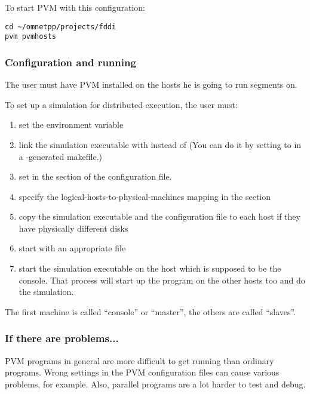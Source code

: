 To start PVM with this configuration:

\begin{verbatim}
cd ~/omnetpp/projects/fddi
pvm pvmhosts
\end{verbatim}

\subsubsection{Configuration and running}

The user must have PVM installed on the hosts he is going to
run segments on.


To set up a simulation for distributed execution, the user must:
\begin{enumerate}
\item{set the  environment variable}
\item{link the simulation executable with  instead of
   (You can do it by setting  to
   in a -generated makefile.)}
\item{set  in the \ttt{[General]} section of the
  configuration file.}
\item{specify the logical-hosts-to-physical-machines mapping in the
  \ttt{[Machines]} section}
\item{copy the simulation executable and the configuration file to
  each host if they have physically different disks}
\item{start  with an appropriate  file}
\item{start the simulation executable on the host which is supposed to
  be the console. That process will start up the program on the other
  hosts too and do the simulation.}
\end{enumerate}

The first machine is called ``console'' or ``master'', the
others are called ``slaves''.


\subsubsection{If there are problems...}


PVM programs in general are more difficult to get running than
ordinary programs. Wrong settings in the PVM configuration files
can cause various problems, for example. Also, parallel programs
are a lot harder to test and debug.


